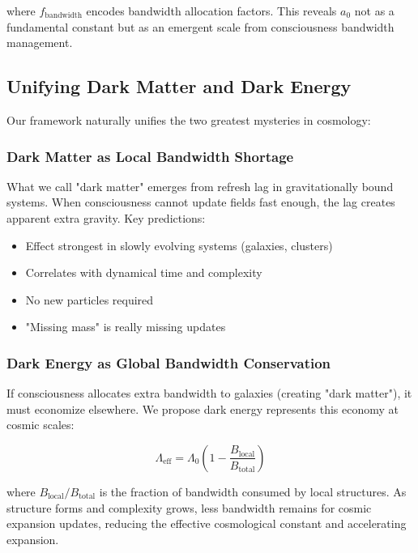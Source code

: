 \documentclass[twocolumn,prd,amsmath,amssymb,aps,superscriptaddress,nofootinbib]{revtex4-2}
\newcommand{\azero}{a_0}
\begin{document}
where $f_{\text{bandwidth}}$ encodes bandwidth allocation factors. This reveals $\azero$ not as a fundamental constant but as an emergent scale from consciousness bandwidth management.

\subsection{Unifying Dark Matter and Dark Energy}

Our framework naturally unifies the two greatest mysteries in cosmology:

\subsubsection{Dark Matter as Local Bandwidth Shortage}

What we call "dark matter" emerges from refresh lag in gravitationally bound systems. When consciousness cannot update fields fast enough, the lag creates apparent extra gravity. Key predictions:
\begin{itemize}
\item Effect strongest in slowly evolving systems (galaxies, clusters)
\item Correlates with dynamical time and complexity
\item No new particles required
\item "Missing mass" is really missing updates
\end{itemize}

\subsubsection{Dark Energy as Global Bandwidth Conservation}

If consciousness allocates extra bandwidth to galaxies (creating "dark matter"), it must economize elsewhere. We propose dark energy represents this economy at cosmic scales:

\begin{equation}
\Lambda_{\text{eff}} = \Lambda_0 \left(1 - \frac{B_{\text{local}}}{B_{\text{total}}}\right)
\label{eq:dark_energy}
\end{equation}

where $B_{\text{local}}/B_{\text{total}}$ is the fraction of bandwidth consumed by local structures. As structure forms and complexity grows, less bandwidth remains for cosmic expansion updates, reducing the effective cosmological constant and accelerating expansion.
\end{document}
